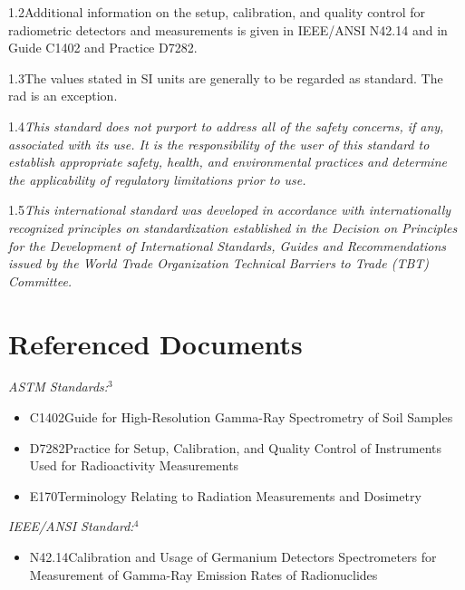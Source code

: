 \documentclass[12pt]{article}
\begin{document}
1.2\quad Additional information on the setup, calibration, and quality control for
radiometric detectors and measurements is given in IEEE/ANSI N42.14 and in Guide C1402
and Practice D7282.

1.3\quad The values stated in SI units are generally to be regarded as standard. The rad is
an exception.

1.4\quad \textit{This standard does not purport to address all of the safety concerns, if
any, associated with its use. It is the responsibility of the user of this standard to
establish appropriate safety, health, and environmental practices and determine the
applicability of regulatory limitations prior to use.}

1.5\quad \textit{This international standard was developed in accordance with
internationally recognized principles on standardization established in the Decision on
Principles for the Development of International Standards, Guides and Recommendations
issued by the World Trade Organization Technical Barriers to Trade (TBT) Committee.}

\section{Referenced Documents}

\quad \textit{ASTM Standards:}$^{3}$

\begin{itemize}[leftmargin=2.5em,label={}]
  \item C1402\quad Guide for High-Resolution Gamma-Ray Spectrometry of Soil Samples
  \item D7282\quad Practice for Setup, Calibration, and Quality Control of Instruments
        Used for Radioactivity Measurements
  \item E170\quad Terminology Relating to Radiation Measurements and Dosimetry
\end{itemize}

\quad \textit{IEEE/ANSI Standard:}$^{4}$

\begin{itemize}[leftmargin=2.5em,label={}]
  \item N42.14\quad Calibration and Usage of Germanium Detectors Spectrometers for
        Measurement of Gamma-Ray Emission Rates of Radionuclides
\end{itemize}

\end{document}
